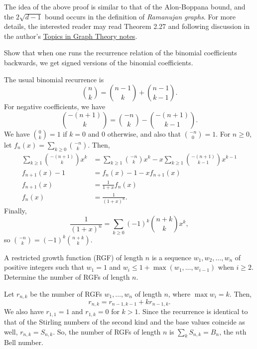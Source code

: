 		The idea of the above proof is similar to that of the Alon-Boppana bound, and the $2\sqrt{d-1}$ bound occurs in the definition of \emph{Ramanujan graphs}. For more details, the interested reader may read Theorem 2.27 and following discussion in the author's \href{https://amitrajaraman.github.io/notes/ma-5109/main.pdf}{Topics in Graph Theory notes}.

		\begin{problem}
			\label{binomial recurrence backwards}
			Show that when one runs the recurrence relation of the binomial coefficients backwards, we get signed versions of the binomial coefficients.
		\end{problem}
		\begin{solution*}
			The usual binomial recurrence is
			\[ \binom{n}{k} = \binom{n-1}{k} + \binom{n-1}{k-1}. \]
			For negative coefficients, we have
			\[ \binom{-(n+1)}{k} = \binom{-n}{k} - \binom{-(n+1)}{k-1}. \]
			We have $\binom{0}{k} = 1$ if $k = 0$ and $0$ otherwise, and also that $\binom{-n}{0} = 1$.
			For $n\ge 0$, let $f_n(x) = \sum_{k \ge 0} \binom{-n}{k}$. Then,
			\begin{align*}
				\sum_{k \ge 1} \binom{-(n+1)}{k} x^k &= \sum_{k \ge 1} \binom{-n}{k} x^k - x \sum_{k \ge 1} \binom{-(n+1)}{k-1} x^{k-1} \\
				f_{n+1}(x)-1 &= f_n(x)-1 - xf_{n+1}(x) \\
				f_{n+1}(x) &= \frac{1}{1+x} f_n(x) \\
				f_{n}(x) &= \frac{1}{(1+x)^n}.
			\end{align*}
			Finally,
			\[ \frac{1}{(1+x)^n} = \sum_{k \ge 0} (-1)^k \binom{n+k}{k} x^k, \]
			so $\binom{-n}{k} = (-1)^k \binom{n+k}{k}$.
		\end{solution*}

		\begin{problem}
			A restricted growth function (RGF) of length $n$ is a sequence $w_1,w_2,\ldots,w_n$ of positive integers such that $w_1 = 1$ and $w_i \le 1 + \max(w_1,\ldots,w_{i-1})$ when $i \ge 2$. Determine the number of RGFs of length $n$.
		\end{problem}
		\begin{solution*}
			Let $r_{n,k}$ be the number of RGFs $w_1,\ldots,w_n$ of length $n$, where $\max w_i = k$. Then,
			\[ r_{n,k} = r_{n-1,k-1} + k r_{n-1,k}. \]
			We also have $r_{1,1} = 1$ and $r_{1,k} = 0$ for $k > 1$. Since the recurrence is identical to that of the Stirling numbers of the second kind and the base values coincide as well, $r_{n,k} = S_{n,k}$. So, the number of RGFs of length $n$ is $\sum_k S_{n,k} = B_n$, the $n$th Bell number.
		\end{solution*}

